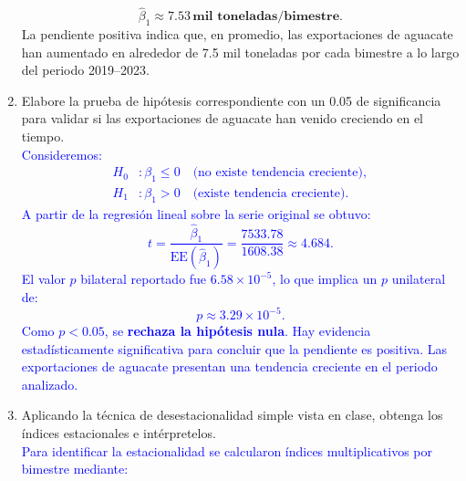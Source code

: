 \documentclass[10pt]{article}
\begin{document}
\begin{enumerate}
{\begin{equation}
        \hat{\beta}_1 \approx \mathbf{7.53 \,\text{mil toneladas/bimestre}}.
      \end{equation}
      \noindent La pendiente positiva indica que, en promedio, las exportaciones de aguacate han aumentado en alrededor de 7.5 mil toneladas por cada bimestre a lo largo del periodo 2019--2023.\\
    }
    \item Elabore la prueba de hipótesis correspondiente con un 0.05 de significancia para validar si las exportaciones de aguacate han venido creciendo en el tiempo.\\
    \textcolor{blue}{
      \noindent Consideremos:
      \begin{align}
        H_0 &: \beta_1 \leq 0 \quad \text{(no existe tendencia creciente)}, \\
        H_1 &: \beta_1 > 0 \quad \text{(existe tendencia creciente)}.
      \end{align}
      \noindent A partir de la regresión lineal sobre la serie original se obtuvo:
      \begin{equation}
        t = \frac{\hat{\beta}_1}{\text{EE}(\hat{\beta}_1)} = \frac{7533.78}{1608.38} \approx 4.684.
      \end{equation}
      \noindent El valor $p$ bilateral reportado fue $6.58 \times 10^{-5}$, lo que implica un $p$ unilateral de:
      \begin{equation}
        p \approx 3.29 \times 10^{-5}.
      \end{equation}
      \noindent Como $p < 0.05$, se \textbf{rechaza la hipótesis nula}. Hay evidencia estadísticamente significativa para concluir que la pendiente es positiva.
      \noindent Las exportaciones de aguacate presentan una tendencia creciente en el periodo analizado.
    }
    \item Aplicando la técnica de desestacionalidad simple vista en clase, obtenga los índices estacionales e intérpretelos.\\
    \textcolor{blue}{
      \noindent Para identificar la estacionalidad se calcularon índices multiplicativos por bimestre mediante:
      \begin{equation}

\end{equation}}
\end{enumerate}
\end{document}
